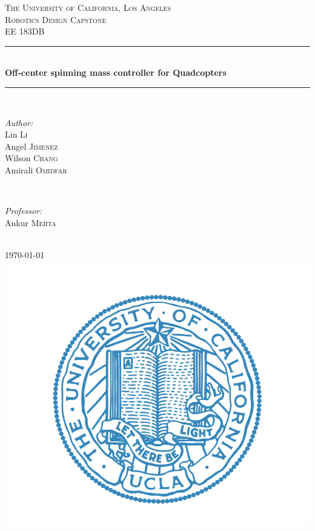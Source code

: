 \begin{titlepage}
\newcommand{\HRule}{\rule{\linewidth}{0.5mm}} %
\center %
\textsc{\LARGE The University of California, Los Angeles}\\[1.5cm] %
\textsc{\Large Robotics Design Capstone}\\[0.5cm] %
\textsc{\large EE 183DB }\\[0.5cm] %
\HRule \\[0.4cm]
{ \huge \bfseries Off-center spinning mass controller for Quadcopters}\\[0.4cm] %
\HRule \\[1.5cm]
\begin{minipage}{0.4\textwidth}
\begin{flushleft} \large
\emph{Author:}\\
Lin \textsc{Li} %
\\
Angel \textsc{Jimenez} %
\\
Wilson \textsc{Chang} %
\\
Amirali \textsc{Omidfar} %
\end{flushleft}
\end{minipage}
~
\begin{minipage}{0.4\textwidth}
\begin{flushright} \large
\emph{Professor:} \\
Ankur \textsc{Mehta} %
\end{flushright}
\end{minipage}\\[1cm]
{\large \today}\\[1cm] %
\includegraphics[scale=0.2]{UCLA_Logo.png}\\[1cm] %
\vfill %
\end{titlepage}
